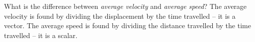 {What is the difference between \textit{average velocity} and \textit{average speed}?
}
{
The average velocity is found by dividing the displacement by the time travelled -- it is a vector. The average speed is found by dividing the distance travelled by the time travelled -- it is a scalar. 
}


